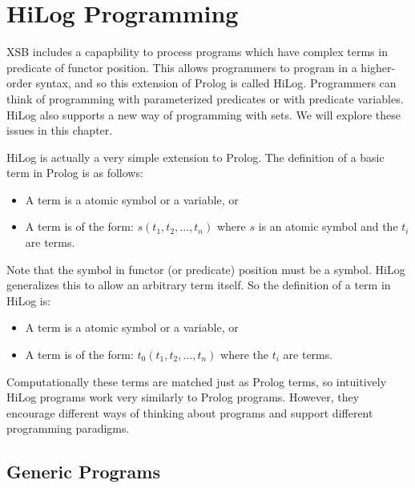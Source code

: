 \chapter{HiLog Programming}

XSB includes a capapbility to process programs which have complex
terms in predicate of functor position.  This allows programmers to
program in a higher-order syntax, and so this extension of Prolog is
called HiLog.  Programmers can think of programming with parameterized
predicates or with predicate variables.  HiLog also supports a new way
of programming with sets.  We will explore these issues in this
chapter.

HiLog is actually a very simple extension to Prolog.  The definition
of a basic term in Prolog is as follows:
\begin{itemize}
\item A term is a atomic symbol or a variable, or
\item A term is of the form: $s(t_1,t_2,...,t_n)$ where $s$ is an 
   atomic symbol and the $t_i$ are terms.
\end{itemize}
Note that the symbol in functor (or predicate) position must be a
symbol.  HiLog generalizes this to allow an arbitrary term itself.
So the definition of a term in HiLog is:
\begin{itemize}
\item A term is a atomic symbol or a variable, or
\item A term is of the form: $t_0(t_1,t_2,...,t_n)$ where the $t_i$ are terms.
\end{itemize}

Computationally these terms are matched just as Prolog terms, so
intuitively HiLog programs work very similarly to Prolog programs.
However, they encourage different ways of thinking about programs and
support different programming paradigms.

\section{Generic Programs}

